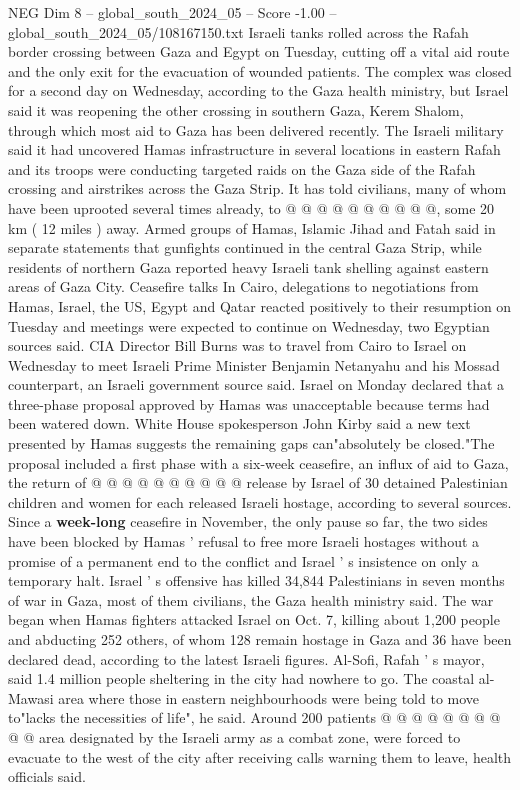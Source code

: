 \begin{textsample}{NEG Dim 8 – global\_south\_2024\_05 – Score -1.00 – global\_south\_2024\_05/108167150.txt}
Israeli tanks rolled across the Rafah border crossing between Gaza and Egypt on Tuesday, cutting off a vital aid route and the only exit for the evacuation of wounded patients.
The complex was closed for a second day on Wednesday, according to the Gaza health ministry, but Israel said it was reopening the other crossing in southern Gaza, Kerem Shalom, through which most aid to Gaza has been delivered recently.
The Israeli military said it had uncovered Hamas infrastructure in several locations in eastern Rafah and its troops were conducting targeted raids on the Gaza side of the Rafah crossing and airstrikes across the Gaza Strip.
It has told civilians, many of whom have been uprooted several times already, to @ @ @ @ @ @ @ @ @ @, some 20 km ( 12 miles ) away.
Armed groups of Hamas, Islamic Jihad and Fatah said in separate statements that gunfights continued in the central Gaza Strip, while residents of northern Gaza reported heavy Israeli tank shelling against eastern areas of Gaza City.
Ceasefire talks In Cairo, delegations to negotiations from Hamas, Israel, the US, Egypt and Qatar reacted positively to their resumption on Tuesday and meetings were expected to continue on Wednesday, two Egyptian sources said.
CIA Director Bill Burns was to travel from Cairo to Israel on Wednesday to meet Israeli Prime Minister Benjamin Netanyahu and his Mossad counterpart, an Israeli government source said.
Israel on Monday declared that a three-phase proposal approved by Hamas was unacceptable because terms had been watered down.
White House spokesperson John Kirby said a new text presented by Hamas suggests the remaining gaps can"absolutely be closed."The proposal included a first phase with a six-week ceasefire, an influx of aid to Gaza, the return of @ @ @ @ @ @ @ @ @ @ release by Israel of 30 detained Palestinian children and women for each released Israeli hostage, according to several sources.
Since a \textbf{week-long} ceasefire in November, the only pause so far, the two sides have been blocked by Hamas ' refusal to free more Israeli hostages without a promise of a permanent end to the conflict and Israel ' s insistence on only a temporary halt.
Israel ' s offensive has killed 34,844 Palestinians in seven months of war in Gaza, most of them civilians, the Gaza health ministry said.
The war began when Hamas fighters attacked Israel on Oct. 7, killing about 1,200 people and abducting 252 others, of whom 128 remain hostage in Gaza and 36 have been declared dead, according to the latest Israeli figures.
Al-Sofi, Rafah ' s mayor, said 1.4 million people sheltering in the city had nowhere to go.
The coastal al-Mawasi area where those in eastern neighbourhoods were being told to move to"lacks the necessities of life", he said.
Around 200 patients @ @ @ @ @ @ @ @ @ @ area designated by the Israeli army as a combat zone, were forced to evacuate to the west of the city after receiving calls warning them to leave, health officials said.

\end{textsample}
